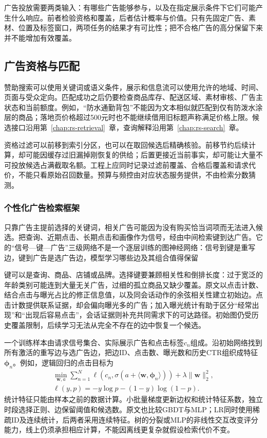 广告投放需要两类输入：有哪些广告能够参与，以及在指定展示条件下它们可能产生什么响应。前者检验资格和覆盖，后者估计概率与价值。只有先固定广告、素材、位置及标签窗口，两项任务的结果才有可比性；把不合格广告的高分保留下来并不能增加有效覆盖。

\subsection{广告资格与匹配}
\label{sec:rs-advertising-eligibility}

赞助搜索可以使用关键词或语义条件，展示和信息流可以使用允许的地域、时间、页面与受众定向。匹配成功之后仍要检查商品库存、配送区域、素材审核、广告主状态和当前额度。例如，“防水通勤背包”不能因为文本相似就匹配到仅有防泼水涂层的商品；落地页价格超过500元时也不能继续借用旧标题声称满足价格上限。候选接口沿用第~\ref{chap:rs-retrieval}~章，查询解释沿用第~\ref{chap:rs-search}~章。

资格过滤可以前移到索引分区，也可以在取回候选后精确核验。前移节约后续计算，却可能因缓存过旧漏掉刚恢复的供给；后置更接近当前事实，却可能让大量不可投放候选占满截取名额。工程上应同时记录过滤前覆盖、合格后覆盖和请求代价，不能只看原始召回数量。预算与频控由对应状态服务提供，不由检索分数猜测。

\subsubsection{个性化广告检索框架}
\label{sec:rs-advertising-retrieval}

只靠广告主提前选择的关键词，相关广告可能因为没有购买恰当词项而无法进入候选。把查询、近期点击、长期点击和画像作为信号，经由中间检索键到达广告。它的“信号—键—广告”三级网络不是一个逐层训练的图神经网络：信号到键是重写边，键到广告是选广告边，模型学习哪些边及其组合值得保留

键可以是查询、商品、店铺或品牌。选择键要兼顾相关性和倒排长度：过于宽泛的年龄类别可能连到大量无关广告，过细的孤立商品又缺少覆盖。原文以点击计数、结合点击与曝光占比的修正信息值，以及同会话动作的余弦相关性建立初始边。点击计数提供联系证据，却会偏向曝光多的广告；加入曝光统计有助于区分“经常出现”和“出现后容易点击”，会话证据则补充共同需求下的可达路径。初始图仍受历史覆盖限制，后续学习无法从完全不存在的边中恢复一个候选。

一个训练样本由请求信号集合、实际展示广告和点击标签$c_n$组成。沿初始网络找到所有激活的重写边与选广告边，把边ID、点击数、曝光数和历史CTR组织成特征$\bm{\phi}_n$。例如，逻辑回归的点击目标为
\begin{equation}
  \begin{gathered}
    \min_{\bm{w},a}
    \sum_{n=1}^{N}
      \ell\!\left(c_n,\sigma(a+\langle\bm{w},\bm{\phi}_n\rangle)\right)
      +\lambda\lVert\bm{w}\rVert_2^2,\\
    \ell(y,p)=-y\log p-(1-y)\log(1-p).
  \end{gathered}
  \label{eq:rs-advertising-retrieval-loss}
\end{equation}
统计特征只能由样本之前的数据计算。小批量梯度更新边权和统计特征系数，独立时段选择正则、边保留阈值和候选数。原文也比较GBDT与MLP；LR同时使用稀疏ID及连续统计，后两者采用连续特征。树的分裂或MLP的非线性交互改变评分能力，线上仍须承担相应计算，不能因离线更复杂就假设检索代价不变。

